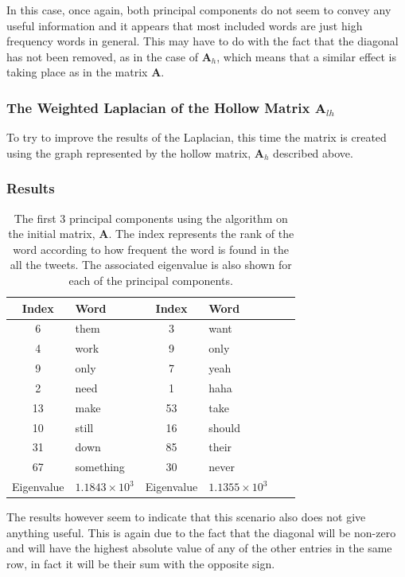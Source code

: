 \documentclass[11pt,a4paper]{article}
\newcommand{\covmat}{\mathbf{A}}
\begin{document}
In this case, once again, both principal components do not seem to convey any useful information and it appears that most included words are just high frequency words in general. This may have to do with the fact that the diagonal has not been removed, as in the case of $\covmat_h$, which means that a similar effect is taking place as in the matrix $\covmat$.

\subsubsection{The Weighted Laplacian of the Hollow Matrix $\mathbf{A}_{lh}$}

To try to improve the results of the Laplacian, this time the matrix is created using the graph represented by the hollow matrix, $\covmat_h$ described above.

\subsubsection*{Results}
\begin{table}[H]
\center
\begin{tabular}{| c l | c l | c l |}
\hline
Index & Word & Index & Word\\
\hline
6 & them & 3 & want\\
4 & work & 9 & only\\
9 & only & 7 & yeah\\
2 & need & 1 & haha\\
13 & make & 53 & take\\
10 & still & 16 & should\\
31 & down & 85 & their\\
67 & something & 30 & never\\
\hline
Eigenvalue & $1.1843\times 10^3$  & Eigenvalue & $1.1355 \times 10^3$   \\
\hline
\end{tabular}
\caption{The first 3 principal components using the algorithm on the initial matrix, $ \mathbf{A}$. The index represents the rank of the word according to how frequent the word is found in the all the tweets. The associated eigenvalue is also shown for each of the principal components.}
\end{table}

The results however seem to indicate that this scenario also does not give anything useful. This is again due to the fact that the diagonal will be non-zero and will have the highest absolute value of any of the other entries in the same row, in fact it will be their sum with the opposite sign.  
\end{document}
